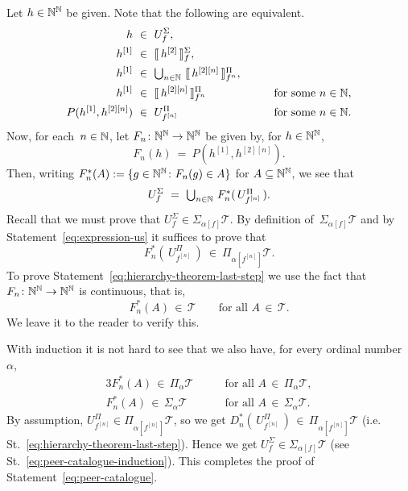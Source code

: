 \documentclass[main.tex]{subfiles}
\begin{document}
Let $h\in\mathbb{N}^{\mathbb{N}}$ be given.
Note that the following are equivalent.
\begin{alignat*}{3}
h \ &\in\  U^\Sigma_f, \\
h^{[1]} \ &\in\ \decode{\,h^{[2]}\,}^\Sigma_f, \\
h^{[1]} \ &\in\ 
\textstyle{\bigcup_{n\in\N}}\ 
        \decode{\,h^{[2][n]}\,}^\Pi_{f^{n}}, \qquad\\
 h^{[1]} \ &\in\ 
        \decode{\,h^{[2][n]}\,}^\Pi_{f^{n}} 
\qquad&\text{for some $n\in\N$},\\
 P(h^{[1]},h^{[2][n]}) \ &\in\ 
        U^{\Pi}_{f^{[n]}} 
\qquad&\text{for some $n\in\N$}.
\end{alignat*}
Now,
for each~$n\in\mathbb{N}$,
let $F_n\colon \mathbb{N}^{\mathbb{N}} \rightarrow\mathbb{N}^{\mathbb{N}}$
be given by, for $h\in\mathbb{N}^{\mathbb{N}}$,
\begin{equation*}
F_n(h) \ =\  P(h^{[1]},h^{[2][n]}).
\end{equation*}
Then, writing $F_n^*(A) := \{ g\in \mathbb{N}^{\mathbb{N}} \colon F_n(g)\in A\}$
for $A\subseteq\mathbb{N}^{\mathbb{N}}$,
we see that
\begin{equation}
\label{eq:expression-us}
U^\Sigma_f \ =\ 
\textstyle{\bigcup_{n\in\N}} \ F_n^*(\, U^\Pi_{f^{[n]}}\,).
\end{equation}
Recall that we must prove
that $U^\Sigma_f \in \Sigma_{\alpha[f]}\mathcal{T}$.
By definition of~$\Sigma_{\alpha[f]}\mathcal{T}$
and by  Statement~\eqref{eq:expression-us}
it suffices to prove 
that
\begin{equation}
\label{eq:hierarchy-theorem-last-step}
F_n^*(\, U^\Pi_{f^{[n]}}\,) \ \in\  \Pi_{\alpha[f^{[n]}]}\mathcal{T}.
\end{equation}
To prove 
Statement~\eqref{eq:hierarchy-theorem-last-step}
we use the fact
 that $F_n \colon \mathbb{N}^{\mathbb{N}} \rightarrow \mathbb{N}^{\mathbb{N}}$
is continuous, that is, 
\begin{equation*}
F_n^* (A) \,\in\,\mathcal{T}
\qquad\text{for all \ $A\,\in\,\mathcal{T}$}.
\end{equation*}
We leave it to the reader to verify this.

With induction it is not hard to see that
we also have, for every ordinal number~$\alpha$,
\begin{alignat*}{3}
F_n^* (A) \,\in\,\Pi_\alpha \mathcal{T}
\qquad&\text{for all \ $A\,\in\,\Pi_\alpha \mathcal{T}$},\\
F_n^* (A) \,\in\,\Sigma_\alpha \mathcal{T}
\qquad&\text{for all \ $A\,\in\,\Sigma_\alpha \mathcal{T}$}.
\end{alignat*}
By assumption, 
$U^\Pi_{f^{[n]}} \in \Pi_{\alpha[f^{[n]}]}\mathcal{T}$,
so we get 
$D^*_n (\,U^\Pi_{f^{[n]}}\,)\,\in\, \Pi_{\alpha[f^{[n]}]}\mathcal{T}$
(i.e. St.~\eqref{eq:hierarchy-theorem-last-step}).
Hence we get $U^\Sigma_f \in \Sigma_{\alpha[f]} \mathcal{T}$
(see St.~\eqref{eq:peer-catalogue-induction}).
This completes the proof of Statement~\eqref{eq:peer-catalogue}.
\end{document}
